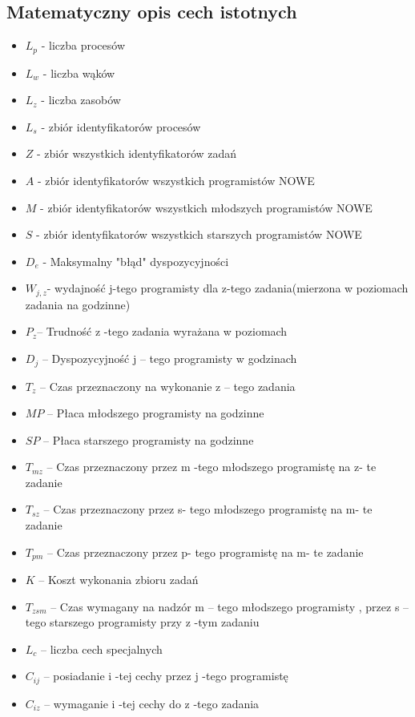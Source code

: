 \documentclass[a4paper,12pt]{extarticle}
\begin{document}
    \subsection{Matematyczny opis cech istotnych}
        \begin{itemize}
            \item	$L_p$ -  liczba procesów
            \item   $L_w$ -  liczba wąków
            \item	$L_z$ -  liczba zasobów
            \item	$L_s$ -  zbiór identyfikatorów procesów
            \item   $Z$ - zbiór wszystkich identyfikatorów zadań
            \item   $A$   - zbiór identyfikatorów wszystkich programistów NOWE
            \item   $M$   - zbiór identyfikatorów wszystkich młodszych programistów NOWE
            \item   $S$   - zbiór identyfikatorów wszystkich starszych programistów NOWE
            \item   $D_e$ - Maksymalny "błąd" dyspozycyjności 
            \item	$W_{j,z}$- wydajność j-tego programisty dla z-tego zadania(mierzona w poziomach zadania na godzinne)
            \item	$P_z $– Trudność z -tego zadania wyrażana w poziomach
            \item	$D_j$ – Dyspozycyjność j – tego programisty w godzinach
            \item	$T_z$ – Czas przeznaczony na wykonanie z – tego zadania
            \item	$MP$ – Płaca młodszego programisty na godzinne
            \item	$SP$ – Płaca starszego programisty na godzinne
            \item	$T_{mz}$ – Czas przeznaczony przez m -tego młodszego programistę na z- te zadanie 
            \item	$T_{sz}$ – Czas przeznaczony przez s- tego młodszego programistę na m- te zadanie 
            \item	$T_{pm}$ – Czas przeznaczony przez p- tego  programistę na m- te zadanie 
            \item	$K$ – Koszt wykonania zbioru zadań
            \item	$T_{zsm}$ – Czas wymagany na nadzór m – tego młodszego programisty , przez s – tego starszego programisty przy z -tym zadaniu
            \item	$L_c$ – liczba cech specjalnych
            \item	$C_{ij}$ – posiadanie i -tej cechy przez j -tego programistę
            \item	$C_{iz}$ – wymaganie i -tej cechy do z -tego zadania 
        \end{itemize}
\end{document}
